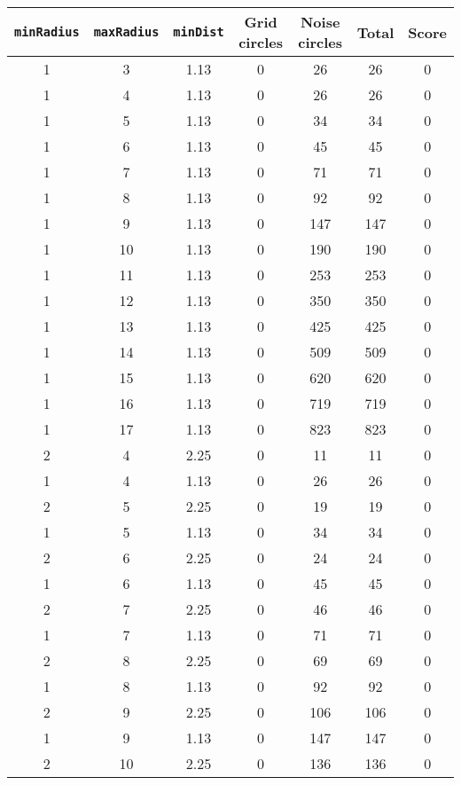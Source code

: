 \documentclass[letterpaper, 12pt]{article}
\begin{document}
\begin{longtable}{|c|c|c|c|c|c|c|}
\hline
\textbf{\texttt{minRadius}} & \textbf{\texttt{maxRadius}} & \textbf{\texttt{minDist}} & \textbf{Grid circles} & \textbf{Noise circles} & \textbf{Total} & \textbf{Score} \\
\hline
1 & 3 & 1.13 & 0 & 26 & 26 & 0 \\
\hline
1 & 4 & 1.13 & 0 & 26 & 26 & 0 \\
\hline
1 & 5 & 1.13 & 0 & 34 & 34 & 0 \\
\hline
1 & 6 & 1.13 & 0 & 45 & 45 & 0 \\
\hline
1 & 7 & 1.13 & 0 & 71 & 71 & 0 \\
\hline
1 & 8 & 1.13 & 0 & 92 & 92 & 0 \\
\hline
1 & 9 & 1.13 & 0 & 147 & 147 & 0 \\
\hline
1 & 10 & 1.13 & 0 & 190 & 190 & 0 \\
\hline
1 & 11 & 1.13 & 0 & 253 & 253 & 0 \\
\hline
1 & 12 & 1.13 & 0 & 350 & 350 & 0 \\
\hline
1 & 13 & 1.13 & 0 & 425 & 425 & 0 \\
\hline
1 & 14 & 1.13 & 0 & 509 & 509 & 0 \\
\hline
1 & 15 & 1.13 & 0 & 620 & 620 & 0 \\
\hline
1 & 16 & 1.13 & 0 & 719 & 719 & 0 \\
\hline
1 & 17 & 1.13 & 0 & 823 & 823 & 0 \\
\hline
2 & 4 & 2.25 & 0 & 11 & 11 & 0 \\
\hline
1 & 4 & 1.13 & 0 & 26 & 26 & 0 \\
\hline
2 & 5 & 2.25 & 0 & 19 & 19 & 0 \\
\hline
1 & 5 & 1.13 & 0 & 34 & 34 & 0 \\
\hline
2 & 6 & 2.25 & 0 & 24 & 24 & 0 \\
\hline
1 & 6 & 1.13 & 0 & 45 & 45 & 0 \\
\hline
2 & 7 & 2.25 & 0 & 46 & 46 & 0 \\
\hline
1 & 7 & 1.13 & 0 & 71 & 71 & 0 \\
\hline
2 & 8 & 2.25 & 0 & 69 & 69 & 0 \\
\hline
1 & 8 & 1.13 & 0 & 92 & 92 & 0 \\
\hline
2 & 9 & 2.25 & 0 & 106 & 106 & 0 \\
\hline
1 & 9 & 1.13 & 0 & 147 & 147 & 0 \\
\hline
2 & 10 & 2.25 & 0 & 136 & 136 & 0 \\
\hline

\end{longtable}
\end{document}
